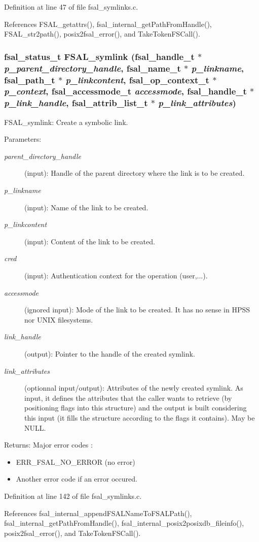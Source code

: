 Definition at line 47 of file fsal\_\-symlinks.c.

References FSAL\_\-getattrs(), fsal\_\-internal\_\-getPathFromHandle(), FSAL\_\-str2path(), posix2fsal\_\-error(), and TakeTokenFSCall().
\subsubsection[{FSAL\_\-symlink}]{\setlength{\rightskip}{0pt plus 5cm}fsal\_\-status\_\-t FSAL\_\-symlink (fsal\_\-handle\_\-t $\ast$ {\em p\_\-parent\_\-directory\_\-handle}, \/  fsal\_\-name\_\-t $\ast$ {\em p\_\-linkname}, \/  fsal\_\-path\_\-t $\ast$ {\em p\_\-linkcontent}, \/  fsal\_\-op\_\-context\_\-t $\ast$ {\em p\_\-context}, \/  fsal\_\-accessmode\_\-t {\em accessmode}, \/  fsal\_\-handle\_\-t $\ast$ {\em p\_\-link\_\-handle}, \/  fsal\_\-attrib\_\-list\_\-t $\ast$ {\em p\_\-link\_\-attributes})}\label{fsal__symlinks_8c_e9c8504226932bb21bdf56e667c8d001}


FSAL\_\-symlink: Create a symbolic link.

\begin{Desc}
\item[Parameters:]
\begin{description}
\item[{\em parent\_\-directory\_\-handle}](input): Handle of the parent directory where the link is to be created. \item[{\em p\_\-linkname}](input): Name of the link to be created. \item[{\em p\_\-linkcontent}](input): Content of the link to be created. \item[{\em cred}](input): Authentication context for the operation (user,...). \item[{\em accessmode}](ignored input): Mode of the link to be created. It has no sense in HPSS nor UNIX filesystems. \item[{\em link\_\-handle}](output): Pointer to the handle of the created symlink. \item[{\em link\_\-attributes}](optionnal input/output): Attributes of the newly created symlink. As input, it defines the attributes that the caller wants to retrieve (by positioning flags into this structure) and the output is built considering this input (it fills the structure according to the flags it contains). May be NULL.\end{description}
\end{Desc}
\begin{Desc}
\item[Returns:]Major error codes :\begin{itemize}
\item ERR\_\-FSAL\_\-NO\_\-ERROR (no error)\item Another error code if an error occured. \end{itemize}
\end{Desc}


Definition at line 142 of file fsal\_\-symlinks.c.

References fsal\_\-internal\_\-appendFSALNameToFSALPath(), fsal\_\-internal\_\-getPathFromHandle(), fsal\_\-internal\_\-posix2posixdb\_\-fileinfo(), posix2fsal\_\-error(), and TakeTokenFSCall().